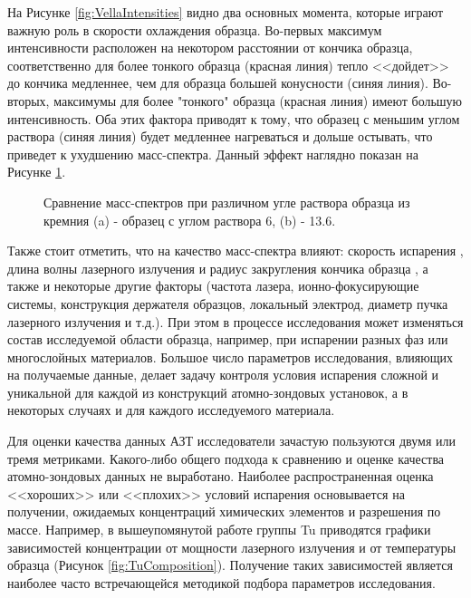 На Рисунке \cref{fig:VellaIntensities} видно два основных момента, которые играют важную роль в скорости охлаждения образца. Во-первых максимум интенсивности расположен на некотором расстоянии от кончика образца, соответственно для более тонкого образца (красная линия) тепло <<дойдет>> до кончика медленнее, чем для образца большей конусности (синяя линия). Во-вторых, максимумы для более "тонкого" образца (красная линия) имеют большую интенсивность. Оба этих фактора приводят к тому, что образец с меньшим углом раствора (синяя линия) будет медленнее нагреваться и дольше остывать, что приведет к ухудшению масс-спектра. Данный эффект наглядно показан на Рисунке \cref{fig:VellaSpectors}.

\begin{figure}[htb]
	\caption{Сравнение масс-спектров при различном угле раствора образца из кремния (a) - образец с углом раствора 6\textdegree, (b) - 13.6\textdegree \cite{Vella18}.}
	\label{fig:VellaSpectors}
\end{figure}

Также стоит отметить, что на качество масс-спектра влияют: скорость испарения \cite{Raznitsyn18}, длина волны лазерного излучения и радиус закругления кончика образца \cite{Houard10}, а также и некоторые другие факторы (частота лазера, ионно-фокусирующие системы, конструкция держателя образцов, локальный электрод, диаметр пучка лазерного излучения и т.д.). При этом в процессе исследования может изменяться состав исследуемой области образца, например, при испарении разных фаз или многослойных материалов. Большое число параметров исследования, влияющих на получаемые данные, делает задачу контроля условия испарения сложной и уникальной для каждой из конструкций атомно-зондовых установок, а в некоторых случаях и для каждого исследуемого материала. 

Для оценки качества данных АЗТ исследователи зачастую пользуются двумя или тремя метриками. Какого-либо общего подхода к сравнению  и оценке качества атомно-зондовых данных не выработано. Наиболее распространенная оценка <<хороших>> или <<плохих>> условий испарения основывается на получении, ожидаемых концентраций химических элементов и разрешения по массе. Например, в вышеупомянутой работе группы Tu \cite{Tu15} приводятся графики зависимостей концентрации от мощности лазерного излучения и от температуры образца (Рисунок \cref{fig:TuComposition}). Получение таких зависимостей является наиболее часто встречающейся методикой подбора параметров исследования. 

